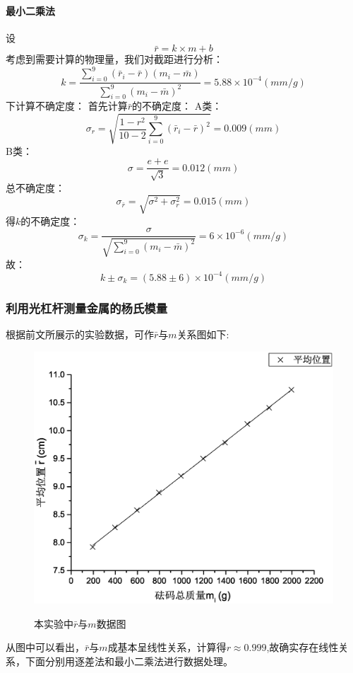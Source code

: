 \documentclass{ctexart}
\begin{document}
\paragraph{最小二乘法}
设$$\bar{r}=k\times m+b$$
考虑到需要计算的物理量，我们对截距进行分析：
$$k=\frac{\sum\limits_{i=0}^9{(\bar{r}_i-\bar{r})(m_i-\bar{m})}}{\sum\limits_{i=0}^9{(m_i-\bar{m})^2}}=5.88\times 10^{-4}(mm/g)$$
下计算不确定度：
首先计算$\bar{r}$的不确定度：
A类：$$\sigma_r =\sqrt{\frac{1-r^2}{10-2}\sum\limits_{i=0}^9{(\bar{r}_i-\bar{r})^2}}=0.009(mm)$$
B类：$$\sigma=\frac{e+e}{\sqrt{3}}=0.012(mm)$$
总不确定度：$$\sigma_{\bar{r}}=\sqrt{\sigma^2+\sigma_r^2}=0.015(mm)$$
得$k$的不确定度：
$$\sigma_k=\frac{\sigma}{\sqrt{\sum\limits_{i=0}^9{(m_i-\bar{m})^2}}}=6\times10^{-6}(mm/g)$$
故：
$$k\pm \sigma_k=(5.88\pm 6  )\times 10^{-4}(mm/g)$$
\subsubsection{利用光杠杆测量金属的杨氏模量}
根据前文所展示的实验数据，可作$\bar{r}$与$m$关系图如下:
\begin{figure}[H]
  \centering
  \caption{本实验中$\bar{r}$与$m$数据图}
  \includegraphics[width=\textwidth]{2}
  \label{fig:digit}
\end{figure}
从图中可以看出，$\bar{r}$与$m$成基本呈线性关系，计算得$r\approx 0.999$,故确实存在线性关系，下面分别用逐差法和最小二乘法进行数据处理。
\end{document}
